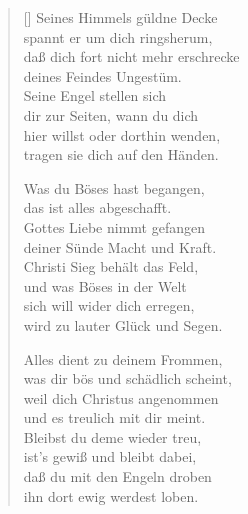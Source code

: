 \begin{multicols}{2}
\begin{verse}[\versewidth]
   Seines Himmels güldne Decke\\
  spannt er um dich ringsherum,\\
  daß dich fort nicht mehr erschrecke\\
  deines Feindes Ungestüm.\\
  Seine Engel stellen sich\\
  dir zur Seiten, wann du dich\\
  hier willst oder dorthin wenden,\\
  tragen sie dich auf den Händen.

   Was du Böses hast begangen,\\
  das ist alles abgeschafft.\\
  Gottes Liebe nimmt gefangen\\
  deiner Sünde Macht und Kraft.\\
  Christi Sieg behält das Feld,\\
  und was Böses in der Welt\\
  sich will wider dich erregen,\\
  wird zu lauter Glück und Segen.

   Alles dient zu deinem Frommen,\\
  was dir bös und schädlich scheint,\\
  weil dich Christus angenommen\\
  und es treulich mit dir meint.\\
  Bleibst du deme wieder treu,\\
  ist's gewiß und bleibt dabei,\\
  daß du mit den Engeln droben\\
  ihn dort ewig werdest loben.

\end{verse}
\end{multicols}
